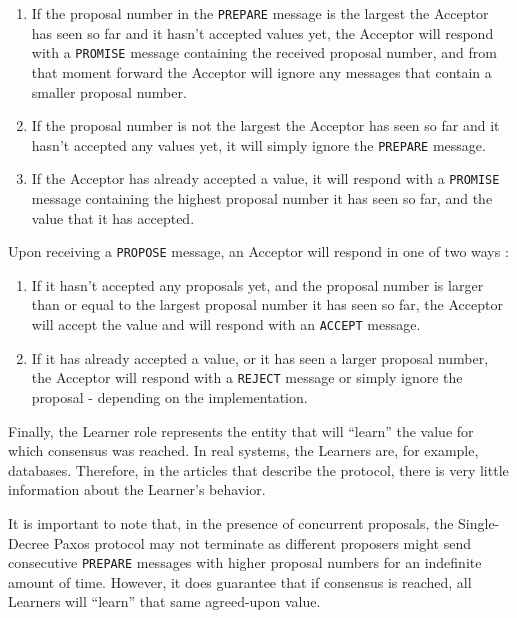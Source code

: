 \begin{enumerate}
  \item If the proposal number in the \texttt{PREPARE} message is the largest the Acceptor has seen so far and it hasn’t accepted values yet, the Acceptor will respond with a \texttt{PROMISE} message containing the received proposal number, and from that moment forward the Acceptor will ignore any messages that contain a smaller proposal number.
  \item If the proposal number is not the largest the Acceptor has seen so far and it hasn’t accepted any values yet, it will simply ignore the \texttt{PREPARE} message.
  \item If the Acceptor has already accepted a value, it will respond with a \texttt{PROMISE} message containing the highest proposal number it has seen so far, and the value that it has accepted.
\end{enumerate}

Upon receiving a \texttt{PROPOSE} message, an Acceptor will respond in one of two ways \cite{paxos_made_simple}:

\begin{enumerate}
  \item If it hasn’t accepted any proposals yet, and the proposal number is larger than or equal to the largest proposal number it has seen so far, the Acceptor will accept the value and will respond with an \texttt{ACCEPT} message.
  \item If it has already accepted a value, or it has seen a larger proposal number, the Acceptor will respond with a \texttt{REJECT} message or simply ignore the proposal - depending on the implementation.
\end{enumerate}

Finally, the Learner role represents the entity that will “learn” the value for which consensus was reached. In real systems, the Learners are, for example, databases. Therefore, in the articles that describe the protocol, there is very little information about the Learner’s behavior.


It is important to note that, in the presence of concurrent proposals, the Single-Decree Paxos protocol may not terminate as different proposers might send consecutive \texttt{PREPARE} messages with higher proposal numbers for an indefinite amount of time. However, it does guarantee that if consensus is reached, all Learners will “learn” that same agreed-upon value.




